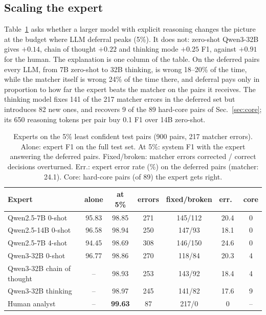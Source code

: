 \documentclass[conference]{IEEEtran}
\begin{document}
\subsection{Scaling the expert}
Table~\ref{tab:experts} asks whether a larger model with explicit reasoning changes the picture at the budget where LLM deferral peaks (5\%). It does not: zero-shot Qwen3-32B gives $+0.14$, chain of thought $+0.22$ and thinking mode $+0.25$ F1, against $+0.91$ for the human. The explanation is one column of the table. On the deferred pairs every LLM, from 7B zero-shot to 32B thinking, is wrong 18--20\% of the time, while the matcher itself is wrong 24\% of the time there, and deferral pays only in proportion to how far the expert beats the matcher on the pairs it receives. The thinking model fixes 141 of the 217 matcher errors in the deferred set but introduces 82 new ones, and recovers 9 of the 89 hard-core pairs of Sec.~\ref{sec:core}; its 650 reasoning tokens per pair buy 0.1 F1 over 14B zero-shot.

\begin{table}[t]
\caption{Experts on the 5\% least confident test pairs (900 pairs, 217 matcher errors). Alone: expert F1 on the full test set. At 5\%: system F1 with the expert answering the deferred pairs. Fixed/broken: matcher errors corrected / correct decisions overturned. Err.: expert error rate (\%) on the deferred pairs (matcher: 24.1). Core: hard-core pairs (of 89) the expert gets right.}
\label{tab:experts}
\centering\scriptsize\setlength{\tabcolsep}{2.2pt}
\begin{tabular}{@{}lcccccc@{}}
\toprule
Expert & alone & at 5\% & errors & fixed/broken & err.\ & core\\
\midrule
Qwen2.5-7B 0-shot & 95.83 & 98.85 & 271 & 145/112 & 20.4 & 0\\
Qwen2.5-14B 0-shot & 96.58 & 98.94 & 250 & 147/93 & 18.1 & 0\\
Qwen2.5-7B 4-shot & 94.45 & 98.69 & 308 & 146/150 & 24.6 & 0\\
Qwen3-32B 0-shot & 96.77 & 98.86 & 270 & 118/84 & 20.3 & 4\\
Qwen3-32B chain of thought & -- & 98.93 & 253 & 143/92 & 18.4 & 4\\
Qwen3-32B thinking & -- & 98.97 & 245 & 141/82 & 17.6 & 9\\
\midrule
Human analyst & -- & \textbf{99.63} & 87 & 217/0 & 0 & --\\
\bottomrule
\end{tabular}
\end{table}
\end{document}
